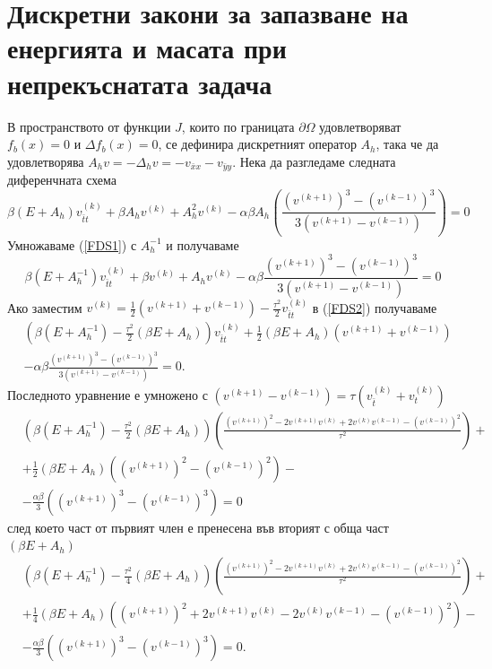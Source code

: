 \documentclass{article}
\newcommand{\be}{\begin{equation}}
\newcommand{\ee}{\end{equation}}
\newcommand{\rf}[1]{(\ref{#1})}
\begin{document}
\section{Дискретни закони за запазване на енергията и масата при непрекъснатата задача}
В пространството от функции $J$, които по границата $\partial\Omega$ удовлетворяват $f_b(x) = 0$ и $\Delta f_b(x) = 0$, се дефинира дискретният оператор $A_h$, така че да удовлетворява $A_h v=-\Delta_h v=-v_{\bar{x}x} - v_{\bar{y}y}$. Нека да разгледаме следната диференчната схема
\be\label{FDS1}
\beta (E+A_h)v_{\bar{t}t}^{(k)} +\beta A_hv^{(k)}+A_h^2 v^{(k)} -\alpha \beta A_h\left(\frac{(v^{(k+1)})^3-(v^{(k-1)})^3}{3(v^{(k+1)}-v^{(k-1)})} \right)=0
\ee
Умножаваме \rf{FDS1} с $A_h^{-1}$ и получаваме
\be\label{FDS2}
\beta (E+A_h^{-1})v_{\bar{t}t}^{(k)} +\beta v^{(k)}+A_h v^{(k)} -\alpha \beta \frac{(v^{(k+1)})^3-(v^{(k-1)})^3}{3(v^{(k+1)}-v^{(k-1)})} = 0
\ee
Ако заместим $v^{(k)}=\frac{1}{2}(v^{(k+1)}+v^{(k-1)})-\frac{\tau^2}{2}v_{\bar{t}t}^{(k)}$ в \rf{FDS2} получаваме
\begin{align*}
&\left( \beta (E+A_h^{-1})- \frac{\tau^2}{2}(\beta E+A_h ) \right)v_{\bar{t}t}^{(k)}  + \frac{1}{2} (\beta E +A_h )(v^{(k+1)}+v^{(k-1)}) \\
&-\alpha \beta \frac{(v^{(k+1)})^3-(v^{(k-1)})^3}{3(v^{(k+1)}-v^{(k-1)})} =0.
\end{align*}
Последното уравнение е умножено с $(v^{(k+1)}-v^{(k-1)})=\tau (v_{\bar{t}}^{(k)} + v_{t}^{(k)})$
\begin{align*}
&\left( \beta (E+A_h^{-1})- \frac{\tau^2}{2}(\beta E+A_h ) \right) \left( \frac{(v^{(k+1)})^2 - 2v^{(k+1)}v^{(k)} + 2v^{(k)}v^{(k-1)} - (v^{(k-1)})^2}{\tau^2}   \right )  + \\
& +\frac{1}{2} (\beta E +A_h ) \left( (v^{(k+1)})^2 - (v^{(k-1)})^2 \right ) - \\
&- \frac{\alpha \beta}{3}\left( (v^{(k+1)})^3-(v^{(k-1)})^3 \right) =0
\end{align*}
след което част от първият член е пренесена във вторият с обща част $(\beta E + A_h )$
\begin{align*}
&\left( \beta (E+A_h^{-1})- \frac{\tau^2}{4}(\beta E+A_h ) \right) \left( \frac{ (v^{(k+1)})^2 - 2v^{(k+1)}v^{(k)} + 2v^{(k)}v^{(k-1)} - (v^{(k-1)})^2}{\tau^2}   \right )  + \\
& +\frac{1}{4} (\beta E +A_h ) \left( (v^{(k+1)})^2 + 2v^{(k+1)}v^{(k)} -2v^{(k)}v^{(k-1)} -  (v^{(k-1)})^2  \right ) - \\
&- \frac{\alpha \beta}{3}\left( (v^{(k+1)})^3-(v^{(k-1)})^3 \right) =0.
\end{align*}
\end{document}
